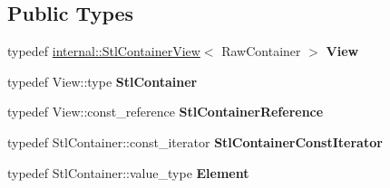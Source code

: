 \subsection*{Public Types}
\begin{DoxyCompactItemize}
\item 
typedef \hyperlink{classtesting_1_1internal_1_1StlContainerView}{internal\+::\+Stl\+Container\+View}$<$ Raw\+Container $>$ {\bfseries View}\hypertarget{classtesting_1_1internal_1_1UnorderedElementsAreMatcherImpl_adbd6dfef7713dd30d569b4220eb808d3}{}\label{classtesting_1_1internal_1_1UnorderedElementsAreMatcherImpl_adbd6dfef7713dd30d569b4220eb808d3}

\item 
typedef View\+::type {\bfseries Stl\+Container}\hypertarget{classtesting_1_1internal_1_1UnorderedElementsAreMatcherImpl_a6c23354dfe53bb47fa3d38d2869e273c}{}\label{classtesting_1_1internal_1_1UnorderedElementsAreMatcherImpl_a6c23354dfe53bb47fa3d38d2869e273c}

\item 
typedef View\+::const\+\_\+reference {\bfseries Stl\+Container\+Reference}\hypertarget{classtesting_1_1internal_1_1UnorderedElementsAreMatcherImpl_acf64d0e328361d4796bcf1aeb91ed975}{}\label{classtesting_1_1internal_1_1UnorderedElementsAreMatcherImpl_acf64d0e328361d4796bcf1aeb91ed975}

\item 
typedef Stl\+Container\+::const\+\_\+iterator {\bfseries Stl\+Container\+Const\+Iterator}\hypertarget{classtesting_1_1internal_1_1UnorderedElementsAreMatcherImpl_a656c30399e17043db476b639dcd4e6fa}{}\label{classtesting_1_1internal_1_1UnorderedElementsAreMatcherImpl_a656c30399e17043db476b639dcd4e6fa}

\item 
typedef Stl\+Container\+::value\+\_\+type {\bfseries Element}\hypertarget{classtesting_1_1internal_1_1UnorderedElementsAreMatcherImpl_ad62ba6ff582afe086d522951f94e30d0}{}\label{classtesting_1_1internal_1_1UnorderedElementsAreMatcherImpl_ad62ba6ff582afe086d522951f94e30d0}

\end{DoxyCompactItemize}

